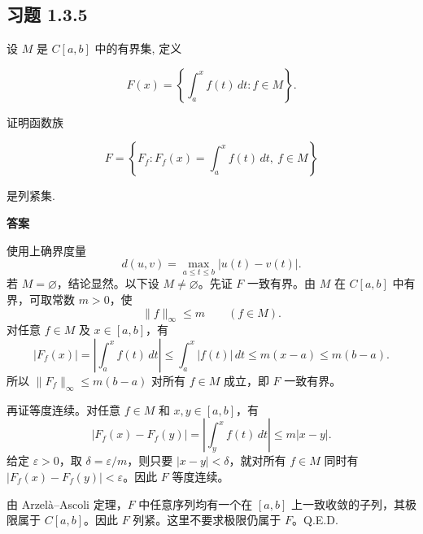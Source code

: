 \documentclass[UTF8,a4paper,11pt,fontset=fandol]{ctexart}
\newcommand{\exercise}[1]{\par\ifdim\dimexpr\pagegoal-\pagetotal\relax<7\baselineskip\newpage\fi\subsection*{习题 #1}}
\newcommand{\answer}{\par\smallskip\noindent\textbf{答案}\quad}
\newcommand{\qedherecustom}{\unskip\hfill\mbox{\normalfont Q.E.D.}\par}
\begin{document}
\exercise{1.3.5}

设 $M$ 是 $C[a,b]$ 中的有界集, 定义

\[
F(x)=\left\{\int_a^x f(t)\,dt:f\in M\right\}.
\]

证明函数族

\[
F=\left\{F_f:F_f(x)=\int_a^x f(t)\,dt,\ f\in M\right\}
\]

是列紧集.

\answer

使用上确界度量
\[
d(u,v)=\max_{a\leq t\leq b}|u(t)-v(t)|.
\]
若 $M=\varnothing$，结论显然。以下设 $M\ne\varnothing$。先证 $F$ 一致有界。由 $M$ 在 $C[a,b]$ 中有界，可取常数 $m>0$，使
\[
\|f\|_\infty\leq m\qquad(f\in M).
\]
对任意 $f\in M$ 及 $x\in[a,b]$，有
\[
|F_f(x)|=\left|\int_a^xf(t)\,dt\right|
\leq\int_a^x|f(t)|\,dt\leq m(x-a)\leq m(b-a).
\]
所以 $\|F_f\|_\infty\leq m(b-a)$ 对所有 $f\in M$ 成立，即 $F$ 一致有界。

再证等度连续。对任意 $f\in M$ 和 $x,y\in[a,b]$，有
\[
|F_f(x)-F_f(y)|=\left|\int_y^xf(t)\,dt\right|\leq m|x-y|.
\]
给定 $\varepsilon>0$，取 $\delta=\varepsilon/m$，则只要 $|x-y|<\delta$，就对所有 $f\in M$ 同时有 $|F_f(x)-F_f(y)|<\varepsilon$。因此 $F$ 等度连续。

由 Arzel\`a--Ascoli 定理，$F$ 中任意序列均有一个在 $[a,b]$ 上一致收敛的子列，其极限属于 $C[a,b]$。因此 $F$ 列紧。这里不要求极限仍属于 $F$。\qedherecustom
\end{document}
